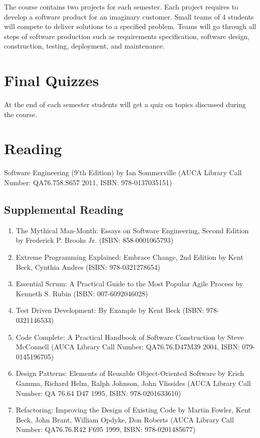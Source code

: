 \documentclass[12pt,a4paper,oneside]{article}
\begin{document}
        The course contains two projects for each semester. Each project
        requires to develop a software product for an imaginary customer. Small
        teams of 4 students will compete to deliver solutions to a specified
        problem. Teams will go through all steps of software production such as
        requirements specification, software design, construction, testing,
        deployment, and maintenance.

    \section{Final Quizzes}

        At the end of each semester students will get a quiz on topics discussed
        during the course.

    \section{Reading}

        Software Engineering (9'th Edition) by Ian Sommerville (AUCA Library
        Call Number: QA76.758.S657 2011, ISBN: 978-0137035151)

            \subsection{Supplemental Reading}

                \begin{enumerate}
                    \item The Mythical Man-Month: Essays on Software
                    Engineering, Second Edition by Frederick P. Brooks Jr.
                    (ISBN: 858-0001065793)
                    \item Extreme Programming Explained: Embrace Change, 2nd
                    Edition by Kent Beck, Cynthia Andres (ISBN: 978-0321278654)
                    \item Essential Scrum: A Practical Guide to the Most Popular
                    Agile Process by Kenneth S. Rubin (ISBN: 007-6092046028)
                    \item Test Driven Development: By Example by Kent Beck
                    (ISBN: 978-0321146533)
                    \item Code Complete: A Practical Handbook of Software
                    Construction by Steve McConnell (AUCA Library Call Number:
                    QA76.76.D47M39 2004, ISBN: 079-0145196705)
                    \item Design Patterns: Elements of Reusable Object-Oriented
                    Software by Erich Gamma, Richard Helm, Ralph Johnson, John
                    Vlissides (AUCA Library Call Number: QA 76.64 D47 1995,
                    ISBN: 978-0201633610)
                    \item Refactoring: Improving the Design of Existing Code by
                    Martin Fowler, Kent Beck, John Brant, William Opdyke, Don
                    Roberts (AUCA Library Call Number: QA76.76.R42 F695 1999,
                    ISBN: 978-0201485677)
                \end{enumerate}
\end{document}
